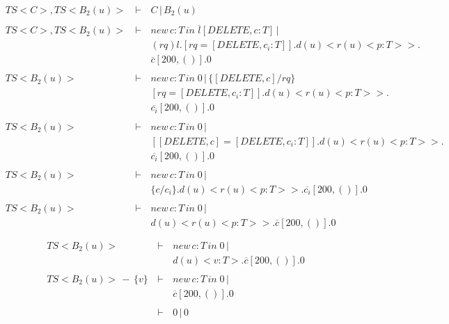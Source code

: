 \setcounter{equation}{0}
\begin{eqnarray*}
 \ TS<C>,TS<B_2(u)>\, &\vdash\,&  C\,|\,B_2(u) \\
 \               &        &          \\
 \ TS<C>,TS<B_2(u)>\, &\vdash\,& new\,c:T\,in\;\overline{l}[DELETE,c:T]\,|\\
 \               &\,      & (rq)l.[rq = [DELETE,c_i:T]].d(u)<r(u)<p:T>>.\\
 \               &\,      & \overline{c}[200,()].0\\
 \               &        &          \\
 \ TS<B_2(u)>\, &\vdash\,& new\,c:T\,in\;0\,|\,\{[DELETE,c]/rq\}\\
 \               &\,      & [rq = [DELETE,c_i:T]].d(u)<r(u)<p:T>>.\\
 \               &\,      & \overline{c_i}[200,()].0\\
 \               &        &          \\
 \ TS<B_2(u)>\, &\vdash\,& new\,c:T\,in\;0\,|\,\\
 \               &\,      & [[DELETE,c] = [DELETE,c_i:T]].d(u)<r(u)<p:T>>.\\
 \               &\,      & \overline{c_i}[200,()].0\\
 \               &        &          \\
 \ TS<B_2(u)>\, &\vdash\,& new\,c:T\,in\;0\,|\,\\
 \               &\,      & \{c/c_i\}.d(u)<r(u)<p:T>>.\overline{c_i}[200,()].0\\
 \               &        &          \\
 \ TS<B_2(u)>\, &\vdash\,& new\,c:T\,in\;0\,|\,\\
 \               &\,      & d(u)<r(u)<p:T>>.\overline{c}[200,()].0\\
 \               &        &          \\
\end{eqnarray*}
\begin{eqnarray*}
 \ TS<B_2(u)>\, &\vdash\,& new\,c:T\,in\;0\,|\,\\
 \               &\,      & d(u)<v:T>.\overline{c}[200,()].0\\
 \               &        &          \\
 \ TS<B_2(u)>\,-\,\{v\}\, &\vdash\,& new\,c:T\,in\;0\,|\,\\
 \               &\,      & \overline{c}[200,()].0\\
 \               &        &          \\
 \ &\vdash\,& 0\,|\,0\\
\end{eqnarray*}

